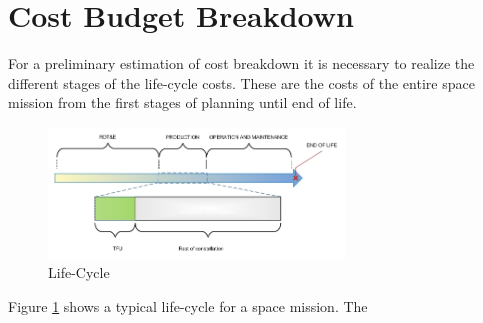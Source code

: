 \section{Cost Budget Breakdown}
\label{blBudgetCost}
For a preliminary estimation of cost breakdown it is necessary to realize the different stages of the life-cycle costs. These are the costs of the entire space mission from the first stages of planning until end of life.
%

\begin{figure}[b]
\begin{center}

\includegraphics[width=0.7\textwidth]{chapters/img/lifetime.jpg}
\caption{Life-Cycle}
\label{fig:lifecycle}
\end{center}
\end{figure}

Figure \ref{fig:lifecycle} shows a typical life-cycle for a space mission. The 

